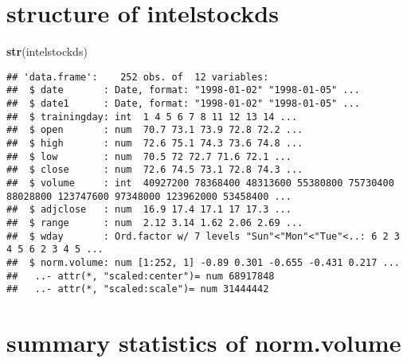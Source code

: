 \documentclass[
]{article}
\newenvironment{Shaded}{\begin{snugshade}}{\end{snugshade}}
\newcommand{\DataTypeTok}[1]{\textcolor[rgb]{0.13,0.29,0.53}{#1}}
\newcommand{\KeywordTok}[1]{\textcolor[rgb]{0.13,0.29,0.53}{\textbf{#1}}}
\newcommand{\NormalTok}[1]{#1}
\newcommand{\OperatorTok}[1]{\textcolor[rgb]{0.81,0.36,0.00}{\textbf{#1}}}
\newcommand{\StringTok}[1]{\textcolor[rgb]{0.31,0.60,0.02}{#1}}
\begin{document}
\begin{Shaded}
\end{Shaded}

\hypertarget{structure-of-intelstockds}{%
\section{structure of intelstockds}\label{structure-of-intelstockds}}

\begin{Shaded}
\begin{Highlighting}[]
\KeywordTok{str}\NormalTok{(intelstockds)}
\end{Highlighting}
\end{Shaded}

\begin{verbatim}
## 'data.frame':    252 obs. of  12 variables:
##  $ date       : Date, format: "1998-01-02" "1998-01-05" ...
##  $ date1      : Date, format: "1998-01-02" "1998-01-05" ...
##  $ trainingday: int  1 4 5 6 7 8 11 12 13 14 ...
##  $ open       : num  70.7 73.1 73.9 72.8 72.2 ...
##  $ high       : num  72.6 75.1 74.3 73.6 74.8 ...
##  $ low        : num  70.5 72 72.7 71.6 72.1 ...
##  $ close      : num  72.6 74.5 73.1 72.8 74.3 ...
##  $ volume     : int  40927200 78368400 48313600 55380800 75730400 88028800 123747600 97348000 123962000 53458400 ...
##  $ adjclose   : num  16.9 17.4 17.1 17 17.3 ...
##  $ range      : num  2.12 3.14 1.62 2.06 2.69 ...
##  $ wday       : Ord.factor w/ 7 levels "Sun"<"Mon"<"Tue"<..: 6 2 3 4 5 6 2 3 4 5 ...
##  $ norm.volume: num [1:252, 1] -0.89 0.301 -0.655 -0.431 0.217 ...
##   ..- attr(*, "scaled:center")= num 68917848
##   ..- attr(*, "scaled:scale")= num 31444442
\end{verbatim}

\hypertarget{summary-statistics-of-norm.volume}{%
\section{summary statistics of
norm.volume}\label{summary-statistics-of-norm.volume}}

\begin{Shaded}
\end{Shaded}
\end{document}
